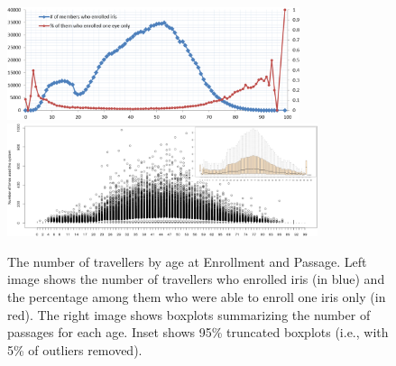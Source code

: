 \documentclass{cta-author}%
\begin{document}
\begin{figure}[!t]
\includegraphics[width=0.45\linewidth,height=1.3in]{eps/age-one-eye.eps}\quad 
\includegraphics[width=0.55\linewidth,height=1.3in]{eps/USED-wInset-0.eps} 

\caption{
The number of travellers by age at Enrollment and Passage. 
Left image shows the number of travellers who enrolled iris (in blue) and the percentage among them who were able to enroll one iris  only (in red). 
The right image shows  boxplots summarizing the number of passages for each age. Inset shows 95\% truncated boxplots (i.e., with 5\% of outliers removed). 
}
\label{fBoxplot-IQen}
\end{figure}
\end{document}
